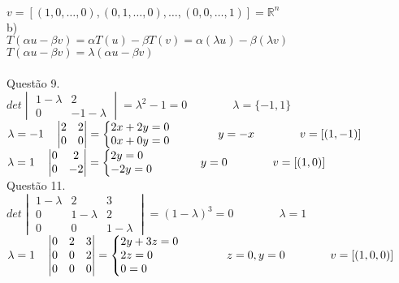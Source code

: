 \documentclass[12pt]{article}
\begin{document}
$v=[(1,0,\dots,0),(0,1,\dots,0),\dots,(0,0,\dots,1)]=\mathds{R}^{n}$\\

\noindent b)\\

$T(\alpha u-\beta v)=\alpha T(u)-\beta T(v)=\alpha(\lambda u)-\beta(\lambda v)$\\

$T(\alpha u-\beta v)=\lambda(\alpha u-\beta v)$\\

\\

\noindent Questão 9.\\

$det\begin{vmatrix}1-\lambda&2\\0&-1-\lambda\end{vmatrix}=\lambda^{2}-1=0\qquad\qquad\lambda=\lbrace-1,1\rbrace$\\

$\lambda=-1\quad\begin{vmatrix}2&2\\0&0\end{vmatrix}=\left\{\begin{array}{@{}l@{}}2x+2y=0\\0x+0y=0\end{array}\right.\qquad\qquad y=-x\qquad\qquad v=[(1,-1)]$\\

$\lambda=1\quad\begin{vmatrix}0&2\\0&-2\end{vmatrix}=\left\{\begin{array}{@{}l@{}}2y=0\\-2y=0\end{array}\right.\qquad\qquad y=0\qquad\qquad v=[(1,0)]$\\

\noindent Questão 11.\\

$det\begin{vmatrix}1-\lambda&2&3\\0&1-\lambda&2\\0&0&1-\lambda\end{vmatrix}=(1-\lambda)^{3}=0\qquad\qquad\lambda=1$\\

$\lambda=1\quad\begin{vmatrix}0&2&3\\0&0&2\\0&0&0\end{vmatrix}=\left\{\begin{array}{@{}l@{}}2y+3z=0\\2z=0\\0=0\end{array}\right.\qquad\qquad z=0,y=0\qquad\qquad v=[(1,0,0)]$\\
\end{document}
